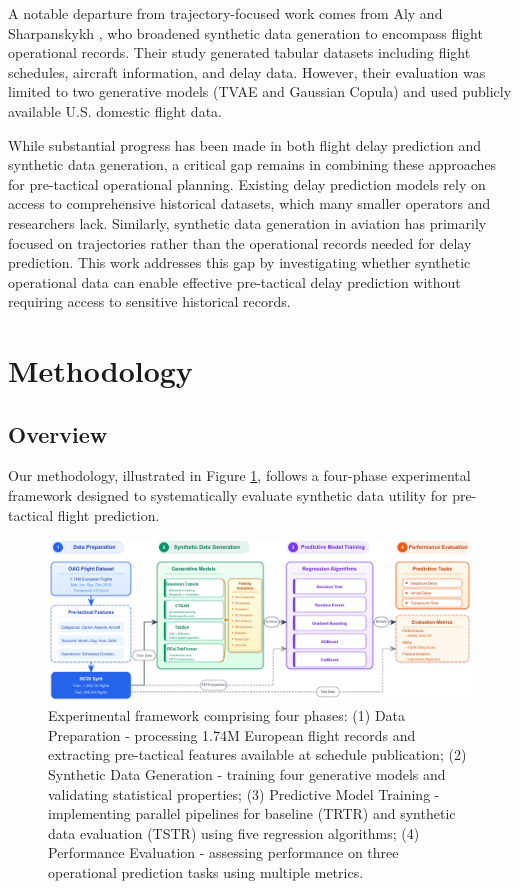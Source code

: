 \documentclass[conference]{IEEEtran}
\begin{document}
A notable departure from trajectory-focused work comes from Aly and Sharpanskykh \cite{aly2025synthetic}, who broadened synthetic data generation to encompass flight operational records. Their study generated tabular datasets including flight schedules, aircraft information, and delay data. However, their evaluation was limited to two generative models (TVAE and Gaussian Copula) and used publicly available U.S. domestic flight data.


While substantial progress has been made in both flight delay prediction and synthetic data generation, a critical gap remains in combining these approaches for pre-tactical operational planning. Existing delay prediction models rely on access to comprehensive historical datasets, which many smaller operators and researchers lack. Similarly, synthetic data generation in aviation has primarily focused on trajectories rather than the operational records needed for delay prediction. This work addresses this gap by investigating whether synthetic operational data can enable effective pre-tactical delay prediction without requiring access to sensitive historical records.



\section{Methodology}

\subsection{Overview} 
Our methodology, illustrated in Figure \ref{fig:framework}, follows a four-phase experimental framework designed to systematically evaluate synthetic data utility for pre-tactical flight prediction. 


\begin{figure}[htbp]
    \centering
    \includegraphics[width=\textwidth]{diagrams/overall_framework.pdf}
    \caption{Experimental framework comprising four phases: (1) Data Preparation - processing 1.74M European flight records and extracting pre-tactical features available at schedule publication; (2) Synthetic Data Generation - training four generative models and validating statistical properties; (3) Predictive Model Training - implementing parallel pipelines for baseline (TRTR) and synthetic data evaluation (TSTR) using five regression algorithms; (4) Performance Evaluation - assessing performance on three operational prediction tasks using multiple metrics.}
    \label{fig:framework}
\end{figure}
\end{document}
